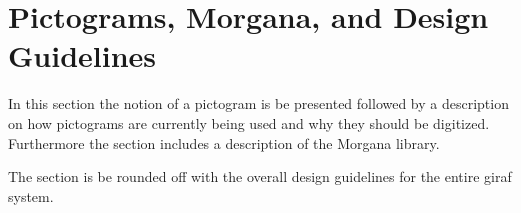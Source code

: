 \section{Pictograms, Morgana, and Design Guidelines}
In this section the notion of a pictogram is be presented followed by a description on how pictograms are currently being used and why they should be digitized. Furthermore the section includes a description of the Morgana library.

The section is be rounded off with the overall design guidelines for the entire \ac{giraf} system.
